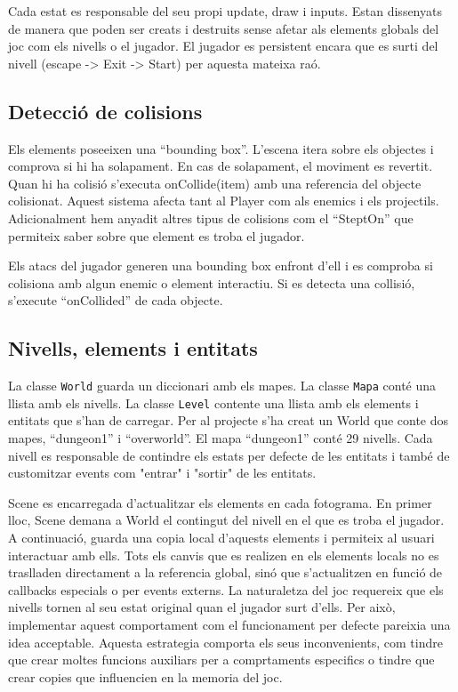 \documentclass[a4paper,12pt]{article}
\begin{document}
Cada estat es responsable del seu propi update, draw i inputs. Estan dissenyats de manera que poden ser creats i destruits sense afetar als elements globals del joc com els nivells o el jugador. El jugador es persistent encara que es surti del nivell (escape -> Exit -> Start) per aquesta mateixa raó.

\subsection{Detecció de colisions}
Els elements poseeixen una ``bounding box''. L'escena itera sobre els objectes i comprova si hi ha solapament. En cas de solapament, el moviment es revertit. Quan hi ha colisió s'executa onCollide(item) amb una referencia del objecte colisionat. Aquest sistema afecta tant al Player com als enemics i els projectils. Adicionalment hem anyadit altres tipus de colisions com el ``SteptOn'' que permiteix saber sobre que element es troba el jugador. 

Els atacs del jugador generen una bounding box enfront d'ell i es comproba si colisiona amb algun enemic o element interactiu. Si es detecta una collisió, s'execute ``onCollided'' de cada objecte.


\subsection{Nivells, elements i entitats}
La classe \texttt{World} guarda un diccionari amb els mapes. La classe \texttt{Mapa} conté una llista amb els nivells. La classe \texttt{Level} contente una llista amb els elements i entitats que s'han de carregar. Per al projecte s'ha creat un World que conte dos mapes, ``dungeon1'' i ``overworld''. El mapa ``dungeon1'' conté 29 nivells. Cada nivell es responsable de contindre els estats per defecte de les entitats i també de customitzar events com "entrar" i "sortir" de les entitats. 

Scene es encarregada d'actualitzar els elements en cada fotograma. En primer lloc, Scene demana a World el contingut del nivell en el que es troba el jugador. A continuació, guarda una copia local d'aquests elements i permiteix al usuari interactuar amb ells. Tots els canvis que es realizen en els elements locals no es traslladen directament a la referencia global, sinó que s'actualitzen en funció de callbacks especials o per events externs. La naturaletza del joc requereix que els nivells tornen al seu estat original quan el jugador surt d'ells. Per això, implementar aquest comportament com el funcionament per defecte pareixia una idea acceptable. Aquesta estrategia comporta els seus inconvenients, com tindre que crear moltes funcions auxiliars per a comprtaments especifics o tindre que crear copies que influencien en la memoria del joc. 
\end{document}
